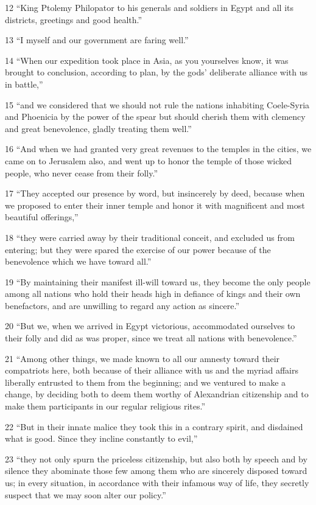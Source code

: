 \par 12 “King Ptolemy Philopator to his generals and soldiers in Egypt and all its districts, greetings and good health.”
\par 13 “I myself and our government are faring well.”
\par 14 “When our expedition took place in Asia, as you yourselves know, it was brought to conclusion, according to plan, by the gods' deliberate alliance with us in battle,”
\par 15 “and we considered that we should not rule the nations inhabiting Coele-Syria and Phoenicia by the power of the spear but should cherish them with clemency and great benevolence, gladly treating them well.”
\par 16 “And when we had granted very great revenues to the temples in the cities, we came on to Jerusalem also, and went up to honor the temple of those wicked people, who never cease from their folly.”
\par 17 “They accepted our presence by word, but insincerely by deed, because when we proposed to enter their inner temple and honor it with magnificent and most beautiful offerings,”
\par 18 “they were carried away by their traditional conceit, and excluded us from entering; but they were spared the exercise of our power because of the benevolence which we have toward all.”
\par 19 “By maintaining their manifest ill-will toward us, they become the only people among all nations who hold their heads high in defiance of kings and their own benefactors, and are unwilling to regard any action as sincere.”
\par 20 “But we, when we arrived in Egypt victorious, accommodated ourselves to their folly and did as was proper, since we treat all nations with benevolence.”
\par 21 “Among other things, we made known to all our amnesty toward their compatriots here, both because of their alliance with us and the myriad affairs liberally entrusted to them from the beginning; and we ventured to make a change, by deciding both to deem them worthy of Alexandrian citizenship and to make them participants in our regular religious rites.”
\par 22 “But in their innate malice they took this in a contrary spirit, and disdained what is good. Since they incline constantly to evil,”
\par 23 “they not only spurn the priceless citizenship, but also both by speech and by silence they abominate those few among them who are sincerely disposed toward us; in every situation, in accordance with their infamous way of life, they secretly suspect that we may soon alter our policy.”
